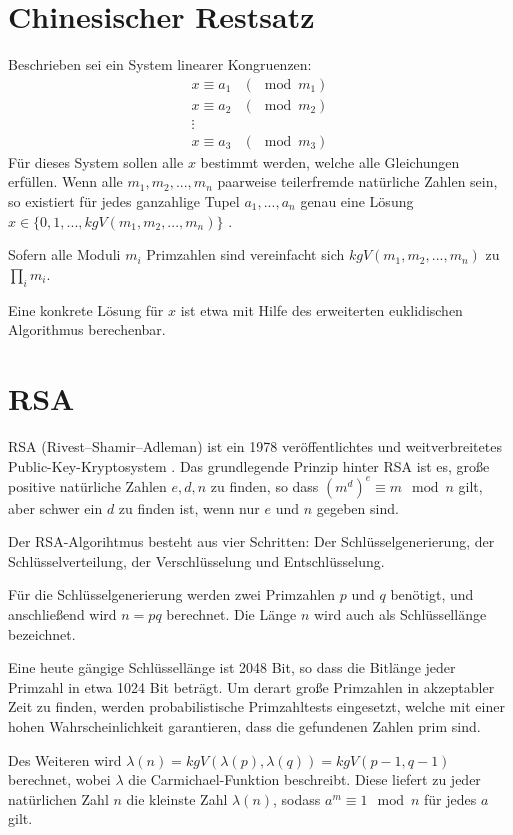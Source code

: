 \section{Chinesischer Restsatz}
\label{chinese_remainder}

Beschrieben sei ein System linearer Kongruenzen:
\begin{align*}
x \equiv a_1 &(\mod m_1)\\
x \equiv a_2 &(\mod m_2)\\
\vdots\\
x \equiv a_3 &(\mod m_3)
\end{align*}
Für dieses System sollen alle $x$ bestimmt werden, welche alle Gleichungen erfüllen.
Wenn alle $m_1,m_2,...,m_n$ paarweise teilerfremde natürliche Zahlen sein, so existiert für jedes ganzahlige Tupel $a_1, ..., a_n$ genau eine Lösung $x \in \{0,1,...,kgV(m_1,m_2,...,m_n)\}$ \cite{CRTwiki}.

Sofern alle Moduli $m_i$ Primzahlen sind vereinfacht sich $kgV(m_1,m_2,...,m_n)$ zu $\prod_i m_i$.

Eine konkrete Lösung für $x$ ist etwa mit Hilfe des erweiterten euklidischen Algorithmus berechenbar.

\section{RSA}

RSA (Rivest–Shamir–Adleman) ist ein 1978 veröffentlichtes und weitverbreitetes Public-Key-Kryptosystem \cite{RSAPaper}.
Das grundlegende Prinzip hinter RSA ist es,  große positive natürliche Zahlen $e,d,n$ zu finden, so dass $(m^d)^e \equiv m \mod n$ gilt, aber schwer ein $d$ zu finden ist, wenn nur $e$ und $n$ gegeben sind.

Der RSA-Algorihtmus besteht aus vier Schritten: Der Schlüsselgenerierung, der Schlüsselverteilung, der Verschlüsselung und Entschlüsselung.

Für die Schlüsselgenerierung werden zwei Primzahlen $p$ und $q$ benötigt, und anschließend wird $n = pq$ berechnet. Die Länge $n$ wird auch als Schlüssellänge bezeichnet.

Eine heute gängige Schlüssellänge ist 2048 Bit, so dass die Bitlänge jeder Primzahl in etwa 1024 Bit beträgt. 
Um derart große Primzahlen in akzeptabler Zeit zu finden, werden probabilistische Primzahltests eingesetzt, welche mit einer hohen Wahrscheinlichkeit garantieren, dass die gefundenen Zahlen prim sind.

Des Weiteren wird $\lambda(n) = kgV(\lambda(p),\lambda(q)) = kgV(p-1, q-1)$ berechnet, wobei $\lambda$ die Carmichael-Funktion beschreibt.
Diese liefert zu jeder natürlichen Zahl $n$ die kleinste Zahl $\lambda(n)$, sodass $a^m \equiv 1 \mod n$ für jedes $a$ gilt.


